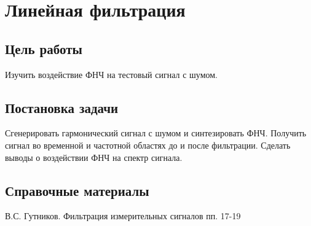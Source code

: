 \documentclass[10pt,a4paper]{article}
\begin{document}
\newpage
\section{Линейная фильтрация}

\subsection{Цель работы}
Изучить воздействие ФНЧ на тестовый сигнал с шумом.

\subsection{Постановка задачи}
Сгенерировать гармонический сигнал с шумом и синтезировать ФНЧ. Получить сигнал во временной и частотной областях до и после фильтрации. Сделать выводы о воздействии ФНЧ на спектр сигнала.

\subsection{Справочные материалы}
В.С. Гутников. Фильтрация измерительных сигналов пп. 17-19
\end{document}
